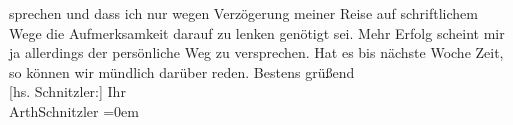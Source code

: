                     sprechen und dass ich nur wegen Verzögerung meiner Reise auf schriftlichem Wege
                    die Aufmerksamkeit darauf zu lenken genötigt sei. Mehr Erfolg scheint mir ja
                    allerdings der persönliche Weg zu versprechen. Hat es bis nächste Woche Zeit, so
                    können wir mündlich darüber reden.\pend
           \pstart
           Bestens grüßend{\\[\baselineskip]}{[}hs. Schnitzler:{]} Ihr{\\[\baselineskip]}\spacefill\mbox{ArthSchnitzler}\pend
           \leftskip=0em{}\endnumbering{}  
      